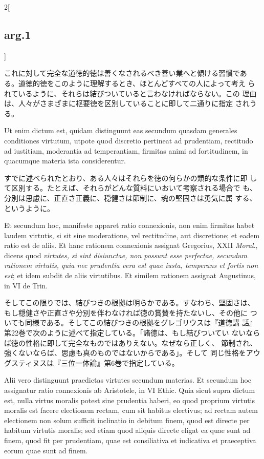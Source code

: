 \documentclass[paper=a4paper,fontsize=10pt,jafontsize=9pt,titlepage]{jlreq}
\begin{document}
\begin{paracol}{2}[\subsection{arg.1}]
\switchcolumn

これに対して完全な道徳的徳は善くなされるべき善い業へと傾ける習慣であ
 る。道徳的徳をこのように理解するとき、ほとんどすべての人によって考え
 られているように、それらは結びついていると言わなければならない。この
 理由は、人々がさまざまに枢要徳を区別していることに即して二通りに指定
 されうる。

\switchcolumn*

Ut enim dictum est, quidam distinguunt eas secundum quasdam generales
 conditiones virtutum, utpote quod discretio pertineat ad prudentiam,
 rectitudo ad iustitiam, moderantia ad temperantiam, firmitas animi ad
 fortitudinem, in quacumque materia ista considerentur.

\switchcolumn

すでに述べられたとおり、ある人々はそれらを徳の何らかの類的な条件に即
 して区別する。たとえば、それらがどんな質料にいおいて考察される場合で
 も、分別は思慮に、正直さ正義に、穏健さは節制に、魂の堅固さは勇気に属
 する、というように。

\switchcolumn*

Et secundum hoc, manifeste apparet ratio connexionis, non enim
 firmitas habet laudem virtutis, si sit sine moderatione, vel
 rectitudine, aut discretione; et eadem ratio est de aliis. Et hanc
 rationem connexionis assignat Gregorius, XXII {\itshape Moral}.,
 dicens quod {\itshape virtutes, si sint disiunctae, non possunt esse
 perfectae, secundum rationem virtutis, quia nec prudentia vera est
 quae iusta, temperans et fortis non est}; et idem subdit de aliis
 virtutibus. Et similem rationem assignat Augustinus, in VI de Trin.

\switchcolumn

そしてこの限りでは、結びつきの根拠は明らかである。すなわち、堅固さは、
 もし穏健さや正直さや分別を伴わなければ徳の賞賛を持たないし、その他に
 ついても同様である。そしてこの結びつきの根拠をグレゴリウスは『道徳講
 話』第22巻で次のように述べて指定している。「諸徳は、もし結びついてい
 ないならば徳の性格に即して完全なものではありえない。なぜなら正しく、
 節制され、強くないならば、思慮も真のものではないからである」。そして
 同じ性格をアウグスティヌスは『三位一体論』第6巻で指定している。

\switchcolumn*

Alii vero distinguunt praedictas virtutes secundum materias. Et
 secundum hoc assignatur ratio connexionis ab Aristotele, in VI
 Ethic. Quia sicut supra dictum est, nulla virtus moralis potest sine
 prudentia haberi, eo quod proprium virtutis moralis est facere
 electionem rectam, cum sit habitus electivus; ad rectam autem
 electionem non solum sufficit inclinatio in debitum finem, quod est
 directe per habitum virtutis moralis; sed etiam quod aliquis directe
 eligat ea quae sunt ad finem, quod fit per prudentiam, quae est
 consiliativa et iudicativa et praeceptiva eorum quae sunt ad finem.


\end{paracol}
\end{document}
